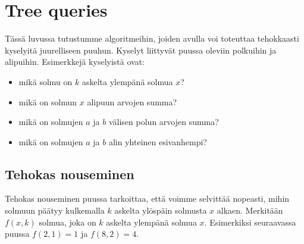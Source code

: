 \chapter{Tree queries}


Tässä luvussa tutustumme algoritmeihin,
joiden avulla voi toteuttaa tehokkaasti kyselyitä
juurelliseen puuhun.
Kyselyt liittyvät puussa oleviin polkuihin
ja alipuihin.
Esimerkkejä kyselyistä ovat:

\begin{itemize}
\item mikä solmu on $k$ askelta ylempänä solmua $x$?
\item mikä on solmun $x$ alipuun arvojen summa?
\item mikä on solmujen $a$ ja $b$ välisen polun arvojen summa?
\item mikä on solmujen $a$ ja $b$ alin yhteinen esivanhempi?
\end{itemize}

\section{Tehokas nouseminen}

Tehokas nouseminen puussa tarkoittaa,
että voimme selvittää nopeasti,
mihin solmuun päätyy kulkemalla
$k$ askelta ylöspäin solmusta $x$ alkaen.
Merkitään $f(x,k)$ solmua,
joka on $k$ askelta ylempänä solmua $x$.
Esimerkiksi seuraavassa puussa
$f(2,1)=1$ ja $f(8,2)=4$.

\begin{center}
\end{center}

